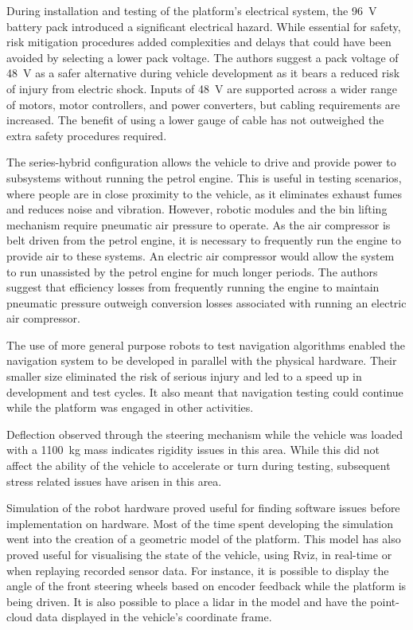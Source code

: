 \documentclass[preprint,authoryear,12pt]{elsarticle}
\begin{document}
    During installation and testing of the platform's electrical system, the \SI{96}{\volt} battery pack introduced a significant electrical hazard.
    While essential for safety, risk mitigation procedures added complexities and delays that could have been avoided by selecting a lower pack voltage.
    The authors suggest a pack voltage of \SI{48}{\volt} as a safer alternative during vehicle development as it bears a reduced risk of injury from electric shock.
    Inputs of \SI{48}{\volt} are supported across a wider range of motors, motor controllers, and power converters, but cabling requirements are increased.
    The benefit of using a lower gauge of cable has not outweighed the extra safety procedures required.

    The series-hybrid configuration allows the vehicle to drive and provide power to subsystems without running the petrol engine.
    This is useful in testing scenarios, where people are in close proximity to the vehicle, as it eliminates exhaust fumes and reduces noise and vibration.
    However, robotic modules and the bin lifting mechanism require pneumatic air pressure to operate.
    As the air compressor is belt driven from the petrol engine, it is necessary to frequently run the engine to provide air to these systems.
    An electric air compressor would allow the system to run unassisted by the petrol engine for much longer periods.
    The authors suggest that efficiency losses from frequently running the engine to maintain pneumatic pressure outweigh conversion losses associated with running an electric air compressor.

    The use of more general purpose robots to test navigation algorithms enabled the navigation system to be developed in parallel with the physical hardware.
    Their smaller size eliminated the risk of serious injury and led to a speed up in development and test cycles.
    It also meant that navigation testing could continue while the platform was engaged in other activities.

    Deflection observed through the steering mechanism while the vehicle was loaded with a \SI{1100}{\kilo\gram} mass indicates rigidity issues in this area.
    While this did not affect the ability of the vehicle to accelerate or turn during testing, subsequent stress related issues have arisen in this area.

    Simulation of the robot hardware proved useful for finding software issues before implementation on hardware.
    Most of the time spent developing the simulation went into the creation of a geometric model of the platform.
    This model has also proved useful for visualising the state of the vehicle, using Rviz, in real-time or when replaying recorded sensor data.
    For instance, it is possible to display the angle of the front steering wheels based on encoder feedback while the platform is being driven.
    It is also possible to place a lidar in the model and have the point-cloud data displayed in the vehicle's coordinate frame.
\end{document}
